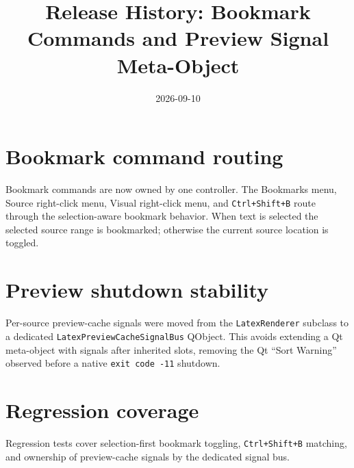 \documentclass[a4paper]{article}
\title{Release History: Bookmark Commands and Preview Signal Meta-Object}
\date{2026-09-10}
\author{}
\begin{document}
\maketitle

\section{Bookmark command routing}
Bookmark commands are now owned by one controller.  The Bookmarks menu,
Source right-click menu, Visual right-click menu, and
\texttt{Ctrl+Shift+B} route through the selection-aware bookmark behavior.
When text is selected the selected source range is bookmarked; otherwise the
current source location is toggled.

\section{Preview shutdown stability}
Per-source preview-cache signals were moved from the
\texttt{LatexRenderer} subclass to a dedicated
\texttt{LatexPreviewCacheSignalBus} QObject.  This avoids extending a Qt
meta-object with signals after inherited slots, removing the Qt
``Sort Warning'' observed before a native \texttt{exit code -11} shutdown.

\section{Regression coverage}
Regression tests cover selection-first bookmark toggling,
\texttt{Ctrl+Shift+B} matching, and ownership of preview-cache signals by the
dedicated signal bus.
\end{document}
